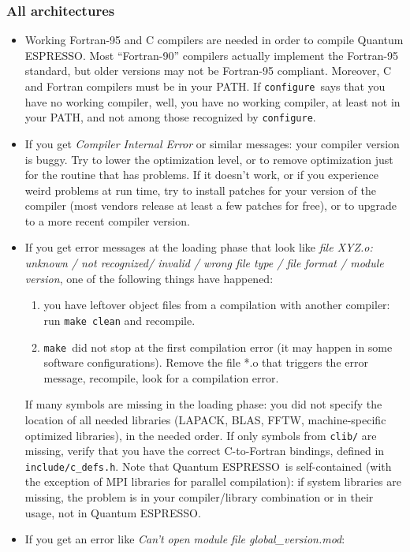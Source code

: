 \documentclass[12pt,a4paper]{article}
\def\qe{{\sc Quantum ESPRESSO}}
\def\configure{\texttt{configure}}
\def\make{\texttt{make}}
\begin{document}
\subsubsection{All architectures}
\begin{itemize}
\item
Working Fortran-95 and C compilers are needed in order
to compile \qe. Most ``Fortran-90'' compilers actually
implement the Fortran-95 standard, but older versions 
may not be Fortran-95 compliant. Moreover, 
C and Fortran compilers must be in your PATH.
If \configure\ says that you have no working compiler, well,
you have no working compiler, at least not in your PATH, and
not among those recognized by \configure.
\item
If you get {\em Compiler Internal Error} or similar messages: your
compiler version is buggy. Try to lower the optimization level, or to
remove optimization just for the routine that has problems. If it
doesn't work, or if you experience weird problems at run time, try to 
install patches for your version of the compiler (most vendors release
at least a few patches for free), or to upgrade to a more recent
compiler version.
\item
If you get error messages at the loading phase that look like 
{\em file XYZ.o: unknown / not recognized/ invalid / wrong
file type / file format / module version},
one of the following things have happened:
\begin{enumerate}
\item you have leftover object files from a compilation with another
  compiler: run \texttt{make clean} and recompile. 
\item \make\ did not stop at the first compilation error (it may 
happen in some software configurations). Remove the file *.o
that triggers the error message, recompile, look for a 
compilation error. 
\end{enumerate}
If many symbols are missing in the loading phase: you did not specify the
location of all needed libraries (LAPACK, BLAS, FFTW, machine-specific
optimized libraries), in the needed order. 
If only symbols from \texttt{clib/} are missing, verify that
you have the correct C-to-Fortran bindings, defined in 
\texttt{include/c\_defs.h}.
Note that \qe\ is self-contained (with the exception of MPI libraries for 
parallel compilation): if system libraries are missing, the problem is in
your compiler/library combination or in their usage, not in \qe.
\item
If you get an error like {\em Can't open module file global\_version.mod}:

\end{itemize}
\end{document}
